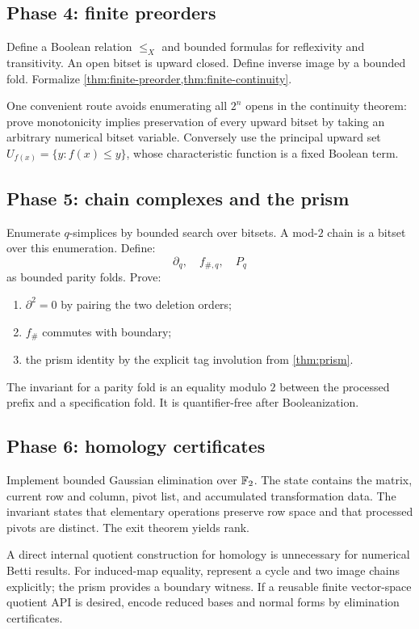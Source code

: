 \subsection{Phase 4: finite preorders}

Define a Boolean relation $\leq_X$ and bounded formulas for reflexivity and transitivity.  An open bitset is upward closed.  Define inverse image by a bounded fold.  Formalize \cref{thm:finite-preorder,thm:finite-continuity}.

One convenient route avoids enumerating all $2^n$ opens in the continuity theorem: prove monotonicity implies preservation of every upward bitset by taking an arbitrary numerical bitset variable.  Conversely use the principal upward set $U_{f(x)}=\{y:f(x)\leq y\}$, whose characteristic function is a fixed Boolean term.

\subsection{Phase 5: chain complexes and the prism}

Enumerate $q$-simplices by bounded search over bitsets.  A mod-$2$ chain is a bitset over this enumeration.  Define:
\[
  \partial_q,\quad f_{\#,q},\quad P_q
\]
as bounded parity folds.  Prove:
\begin{enumerate}
  \item $\partial^2=0$ by pairing the two deletion orders;
  \item $f_\#$ commutes with boundary;
  \item the prism identity by the explicit tag involution from \cref{thm:prism}.
\end{enumerate}

The invariant for a parity fold is an equality modulo $2$ between the processed prefix and a specification fold.  It is quantifier-free after Booleanization.

\subsection{Phase 6: homology certificates}

Implement bounded Gaussian elimination over $\mathbb{F}_{2}$.  The state contains the matrix, current row and column, pivot list, and accumulated transformation data.  The invariant states that elementary operations preserve row space and that processed pivots are distinct.  The exit theorem yields rank.

A direct internal quotient construction for homology is unnecessary for numerical Betti results.  For induced-map equality, represent a cycle and two image chains explicitly; the prism provides a boundary witness.  If a reusable finite vector-space quotient API is desired, encode reduced bases and normal forms by elimination certificates.

